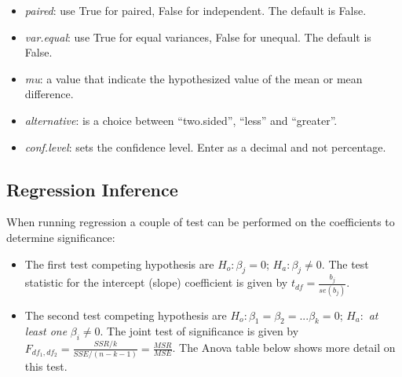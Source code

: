 \documentclass[
  letterpaper,
  DIV=11,
  numbers=noendperiod]{scrreprt}
\begin{document}
\begin{itemize}
\item
  \emph{paired}: use True for paired, False for independent. The default
  is False.
\item
  \emph{var.equal}: use True for equal variances, False for unequal. The
  default is False.
\item
  \emph{mu}: a value that indicate the hypothesized value of the mean or
  mean difference.
\item
  \emph{alternative}: is a choice between ``two.sided'', ``less'' and
  ``greater''.
\item
  \emph{conf.level}: sets the confidence level. Enter as a decimal and
  not percentage.
\end{itemize}

\hypertarget{regression-inference}{%
\subsection*{Regression Inference}\label{regression-inference}}

When running regression a couple of test can be performed on the
coefficients to determine significance:

\begin{itemize}
\item
  The first test competing hypothesis are \(H_o: \beta_j = 0\);
  \(H_a: \beta_j \ne 0\). The test statistic for the intercept (slope)
  coefficient is given by \(t_{df}= \frac {b_j}{se(b_j)}\).
\item
  The second test competing hypothesis are
  \(H_o: \beta_1=\beta_2=...\beta_k=0\); \(H_a:\) \emph{at least one}
  \(\beta_i \neq 0\). The joint test of significance is given by
  \(F_{df_1,df_2} = \frac {SSR/k}{SSE/(n-k-1)} = \frac {MSR}{MSE}\). The
  Anova table below shows more detail on this test.
\end{itemize}
\end{document}
